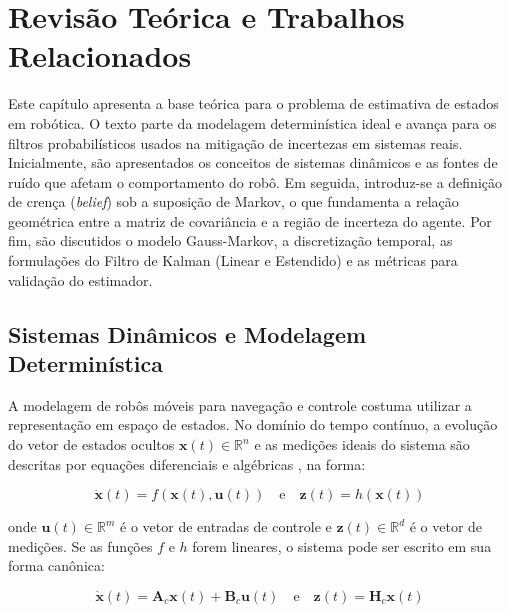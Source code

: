 \section{Revisão Teórica e Trabalhos Relacionados}
\label{sec:theoretical}

Este capítulo apresenta a base teórica para o problema de estimativa de estados em robótica. O texto parte da modelagem determinística ideal e avança para os filtros probabilísticos usados na mitigação de incertezas em sistemas reais. Inicialmente, são apresentados os conceitos de sistemas dinâmicos e as fontes de ruído que afetam o comportamento do robô. Em seguida, introduz-se a definição de crença (\textit{belief}) sob a suposição de Markov, o que fundamenta a relação geométrica entre a matriz de covariância e a região de incerteza do agente. Por fim, são discutidos o modelo Gauss-Markov, a discretização temporal, as formulações do Filtro de Kalman (Linear e Estendido) e as métricas para validação do estimador.

\subsection{Sistemas Dinâmicos e Modelagem Determinística}
\label{subsec:dynamical_sys}

A modelagem de robôs móveis para navegação e controle costuma utilizar a representação em espaço de estados. No domínio do tempo contínuo, a evolução do vetor de estados ocultos $\mathbf{x}(t) \in \mathbb{R}^n$ e as medições ideais do sistema são descritas por equações diferenciais e algébricas \cite{ogata2010}, na forma:

\begin{equation}
    \label{eq:dinamica_continua}
    \dot{\mathbf{x}}(t) = f(\mathbf{x}(t), \mathbf{u}(t))
    \quad \text{e} \quad
    \mathbf{z}(t) = h(\mathbf{x}(t))
\end{equation}

onde $\mathbf{u}(t) \in \mathbb{R}^m$ é o vetor de entradas de controle e $\mathbf{z}(t) \in \mathbb{R}^d$ é o vetor de medições. Se as funções $f$ e $h$ forem lineares, o sistema pode ser escrito em sua forma canônica:

\begin{equation}
    \label{eq:sistema_linear_continuo}
    \dot{\mathbf{x}}(t) = \mathbf{A}_c \mathbf{x}(t) + \mathbf{B}_c \mathbf{u}(t)
    \quad \text{e} \quad
    \mathbf{z}(t) = \mathbf{H}_c \mathbf{x}(t)
\end{equation}

